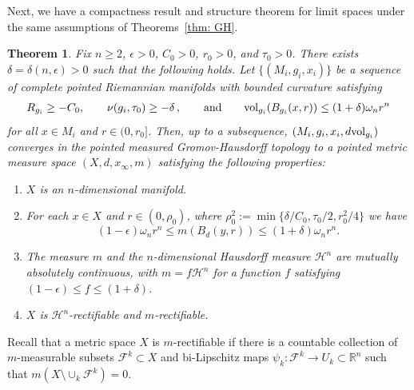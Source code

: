 \documentclass[11pt,reqno]{amsart}
\newtheorem{theorem}{Theorem}[section]
\theoremstyle{remark}
\theoremstyle{definition}
\numberwithin{equation}{section}
\newcommand{\R}{{\mathbb{R}}}
\newcommand{\e}{{\epsilon}}
\newcommand{\Hi}{{\mathcal{H}}}
\newcommand{\om}{\omega}
\newcommand{\vol}{{\rm{vol}}}
\begin{document}
Next, we have a  compactness result and structure theorem for limit spaces under the same assumptions of Theorems~\ref{thm: GH}.
\begin{theorem}\label{thm: limit structure theorem}
	Fix $n\geq 2$, $\e> 0$, $C_0>0$, $r_0>0$, and $\tau_0>0$.
There exists $\delta=\delta(n, \e )>0$ such that the following holds. Let 
$\{ (M_i, g_i,x_i)\}$
	be a sequence of complete pointed Riemannian manifolds with bounded curvature satisfying 
	\begin{align}\label{eqn: hp limit}
		R_{g_i}\geq -C_0 ,\qquad		\nu(g_i, \tau_0) \geq -\delta \,, \qquad \text{and} \qquad \vol_{g_i}(B_{g_i}(x, r) ) \leq (1+\delta) \om_n r^n
	\end{align}
	for all $x \in M_i$ and $r \in (0,r_0]$.
	Then, up to a subsequence, $(M_i, g_i,x_i, d\vol_{g_i})$ converges in
the pointed measured Gromov-Hausdorff topology to a pointed metric measure space $(X, d, x_\infty, m)$ satisfying the following properties:
\begin{enumerate}
	\item $X$ is an $n$-dimensional manifold.
	\item For each $x\in X$ and $r\in(0,\rho_0)$, where $\rho_0^2 := \min\{\delta/C_0,\tau_0/2, r_0^2/4\}$ we have
	\begin{equation}\label{eqn: limit space volumes of balls}
		(1-\e)\om_nr^n\leq m(B_d(y,r))\leq (1+\delta)\om_n r^n.
	\end{equation}
	\item\label{item4} The measure $m$ and the $n$-dimensional Hausdorff measure $\mathcal{H}^n$ are mutually absolutely continuous, with $m =f\mathcal{H}^n$ for a function $f$ satisfying $(1-\e) \leq f \leq (1+\delta)$.
	\item $X$ is $\Hi^n$-rectifiable and $m$-rectifiable. 
\end{enumerate}
\end{theorem}
Recall that a metric space $X$ is $m$-rectifiable if there is a countable collection of $m$-measurable subsets $\mathcal{F}^k\subset X$ and bi-Lipschitz maps $\psi_k:\mathcal{F}^k \to U_k\subset\R^n$ such that $m (X \setminus \cup_k \mathcal{F}^k)  =0.$
\end{document}
